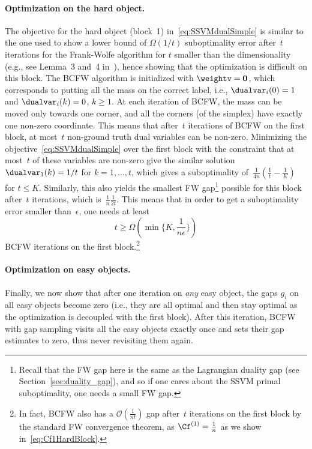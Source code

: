 \documentclass{article}
\begin{document}
\paragraph{Optimization on the hard object.}
The objective for the hard object (block~1) in~\eqref{eq:SSVMdualSimple} is similar to the one used to show a lower bound of $\Omega(1/t)$ suboptimality error after~$t$ iterations for the Frank-Wolfe algorithm for $t$ smaller than the dimensionality (e.g., see Lemma~3 and~4 in~), hence showing that the optimization is difficult on this block.
The BCFW algorithm is initialized with $\weightv = \bm{0}$, which corresponds to putting all the mass on the correct label, i.e., $\dualvar_i(0)=1$ and $\dualvar_i(k)=0$, $k\geq 1$. 
At each iteration of BCFW, the mass can be moved only towards one corner, and all the corners (of the simplex) have exactly one non-zero coordinate.
This means that after~$t$ iterations of BCFW on the first block, at most~$t$ non-ground truth dual variables can be non-zero. Minimizing the objective~\eqref{eq:SSVMdualSimple} over the first block with the constraint that at most~$t$ of these variables are non-zero give the similar solution~$\dualvar_1(k)=1/t$ for $k=1, \ldots, t$, which gives a suboptimality of~$\frac{1}{4n}(\frac{1}{t} - \frac{1}{K})$ for $t \leq K$. 
Similarly, this also yields the smallest FW gap\footnote{Recall that the FW gap here is the same as the Lagrangian duality gap (see Section~\ref{sec:duality_gap}), and so if one cares about the SSVM primal suboptimality, one needs a small FW gap.} 
possible for this block after~$t$ iterations, which is~$\frac{1}{n}\frac{1}{2t}$. This means that in order to get a suboptimality error smaller than~$\epsilon$, one needs at least
\begin{equation} \label{eq:HardBlockComplexity}
t \geq \Omega(\min\{K, \frac{1}{n\epsilon}\} ) 
\end{equation} 
BCFW iterations on the first 
block.\footnote{In fact, BCFW also has a $\mathcal{O}(\frac{1}{nt})$ gap after~$t$ iterations on the first block by the standard FW convergence theorem, as $\Cf^{(1)} = \frac{1}{n}$ as we show in~\eqref{eq:Cf1HardBlock}.}

%
%
%
%
%
%

%
%
%
%
%
%
%
%
%
%
%
%
%
%
 
\paragraph{Optimization on easy objects.}
Finally, we now show that after one iteration on \emph{any} easy object, the gaps $g_i$ on all easy objects become zero (i.e., they are all optimal and then stay optimal as the optimization is decoupled with the first block). After this iteration, BCFW with gap sampling visits all the easy objects exactly once and sets their gap estimates to zero, thus never revisiting them again.
\end{document}
